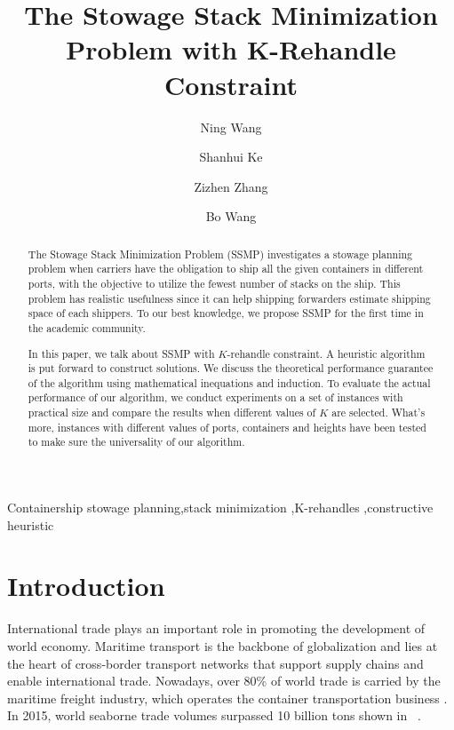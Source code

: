 \documentclass[review,3p,times,authoryear,12pt]{elsarticle}
\begin{document}
\begin{frontmatter}
\newpage

\title{The Stowage Stack Minimization Problem with K-Rehandle Constraint}
\author[shu]{Ning Wang}

\author[shu]{Shanhui Ke}

\author[syu]{Zizhen Zhang}

\author[set]{Bo Wang}


\address[shu]{
Department of Information Management, School of Management, Shanghai University, Shanghai, China
}
\address[syu]{
School of Data and Computer Science, Sun Yat-Sen University, China
}
\address[set]{
College of Urban Rail Transportation, Shanghai University of Engineering Science
}

\begin{abstract}
The Stowage Stack Minimization Problem (SSMP) investigates a stowage planning problem when carriers have the obligation to ship all the given containers in different ports, with the objective to utilize the fewest number of stacks on the ship. This problem has realistic usefulness since it can help shipping forwarders estimate shipping space of each shippers.
To our best knowledge, we propose SSMP for the first time in the academic community.

In this paper, we talk about SSMP with $K$-rehandle constraint. A heuristic algorithm is put forward to construct solutions. We discuss the theoretical performance guarantee of the algorithm using mathematical inequations and induction.
To evaluate the actual performance of our algorithm, we conduct experiments on a set of instances with practical size and compare the results when different values of $K$ are selected.
What's more, instances with different values of ports, containers and heights have been tested to make sure the universality of our algorithm.
\end{abstract}

\begin{keyword}
Containership stowage planning\sep stack minimization \sep K-rehandles \sep constructive heuristic
\end{keyword}
\end{frontmatter}


\section{Introduction}
\label{sec:i}
International trade plays an important role in promoting the development of world economy.
Maritime transport is the backbone of globalization and lies at the heart of cross-border transport networks that support supply chains and enable international trade.
Nowadays, over 80\% of world trade is carried by the maritime freight industry, which operates the container transportation business \citep{zhang2016multiobjective}.
In 2015, world seaborne trade volumes surpassed 10 billion tons shown in ~\cite{unctad2016}.
\end{document}
